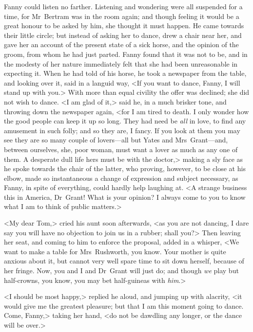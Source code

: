 Fanny could listen no farther. Listening and wondering were all suspended for a time, for Mr~Bertram was in the room again; and though feeling it would be a great honour to be asked by him, she thought it must happen. He came towards their little circle; but instead of asking her to dance, drew a chair near her, and gave her an account of the present state of a sick horse, and the opinion of the groom, from whom he had just parted. Fanny found that it was not to be, and in the modesty of her nature immediately felt that she had been unreasonable in expecting it. When he had told of his horse, he took a newspaper from the table, and looking over it, said in a languid way, <If you want to dance, Fanny, I will stand up with you.> With more than equal civility the offer was declined; she did not wish to dance. <I am glad of it,> said he, in a much brisker tone, and throwing down the newspaper again, <for I am tired to death. I only wonder how the good people can keep it up so long. They had need be \textit{all}  in love, to find any amusement in such folly; and so they are, I fancy. If you look at them you may see they are so many couple of lovers—all but Yates and Mrs~Grant—and, between ourselves, she, poor woman, must want a lover as much as any one of them. A desperate dull life hers must be with the doctor,> making a sly face as he spoke towards the chair of the latter, who proving, however, to be close at his elbow, made so instantaneous a change of expression and subject necessary, as Fanny, in spite of everything, could hardly help laughing at. <A strange business this in America, Dr~Grant! What is your opinion? I always come to you to know what I am to think of public matters.>

<My dear Tom,> cried his aunt soon afterwards, <as you are not dancing, I dare say you will have no objection to join us in a rubber; shall you?> Then leaving her seat, and coming to him to enforce the proposal, added in a whisper, <We want to make a table for Mrs~Rushworth, you know. Your mother is quite anxious about it, but cannot very well spare time to sit down herself, because of her fringe. Now, you and I and Dr~Grant will just do; and though \textit{we}  play but half-crowns, you know, you may bet half-guineas with \textit{him}.>

<I should be most happy,> replied he aloud, and jumping up with alacrity, <it would give me the greatest pleasure; but that I am this moment going to dance. Come, Fanny,> taking her hand, <do not be dawdling any longer, or the dance will be over.>

